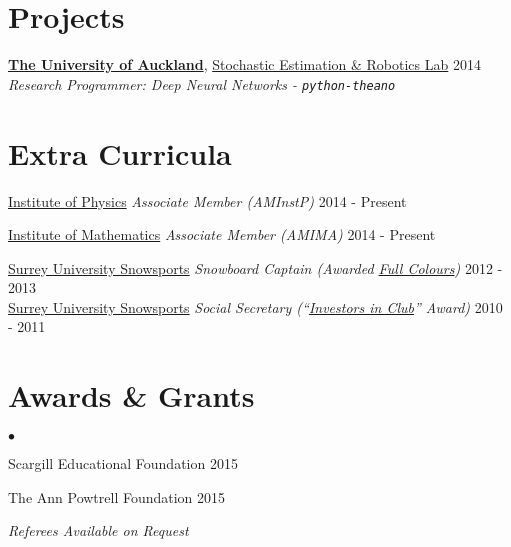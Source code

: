 \documentclass[margin, line]{res}
\newcommand{\IOP}{http://www.iop.org}
\newcommand{\IOM}{http://www.ima.org.uk}
\newcommand{\AucklandUni}{https://www.cs.auckland.ac.nz/en.html}
\newcommand{\AucklandResearch}{http://homepages.engineering.auckland.ac.nz/~smohan/Research.html}
\newcommand{\BFGS}{http://en.wikipedia.org/wiki/Broyden-Fletcher-Goldfarb-Shanno_algorithm}
\newcommand{\GARCH}{https://www.quantnet.com/threads/student-t-innovation-problems-garch-1-1.15612/\#post-125141}
\newcommand{\Jim}{http://www.jimal-khalili.com/teaching}
\newcommand{\susnow}{}%
\newcommand{\eussc}{}%
\newcommand{\Colours}{http://www.ussu.co.uk/ClubsSocieties/Sport/Colours\%20Documents/Colours\%20-\%20Individual\%20Club\%20Exceptions\%20to\%20Colours\%20Criteria\%202015.pdf}
\newcommand{\Investors}{}%
\newenvironment{list2}{
	\begin{list}{$\bullet$}{%
		\setlength{\itemsep}{0in}
		\setlength{\parsep}{0in} \setlength{\parskip}{0in}
		\setlength{\topsep}{0in} \setlength{\partopsep}{0in}
		\setlength{\leftmargin}{0.2in}}}{\end{list}}
\begin{document}
\begin{resume}
\vspace{0.15in}
\section{\sc Projects}

{\bf \href{\AucklandUni}{The University of Auckland}}, \href{\AucklandResearch}{Stochastic Estimation \& Robotics Lab} \hfill {2014}
\\
\vspace{-.3cm}
{\em Research Programmer: Deep Neural Networks - \verb|python-theano|}\\


\vspace{0.15in}
\section{\sc Extra Curricula}
{\href{\IOP}{Institute of Physics}}
\vspace*{-.0in}
{\em Associate Member (AMInstP)} \hfill { 2014 - Present} \\
\vspace*{-0.3in}

{\href{\IOM}{Institute of Mathematics}}
{\em Associate Member (AMIMA)} \hfill { 2014 - Present} \\
\vspace*{-0.3in}

{\href{\susnow}{Surrey University Snowsports}}
	{\em Snowboard Captain (Awarded \href{\Colours}{Full Colours})} \hfill {2012 - 2013}
\\
{\href{\susnow}{Surrey University Snowsports}}
	{\em Social Secretary (``\href{\Investors}{Investors in Club}'' Award)} \hfill {2010 - 2011} 


\vspace{0.15in}
\section{\sc Awards \& Grants}
\begin{list2}
	\item Scargill Educational Foundation \hfill {2015}
	\item The Ann Powtrell Foundation \hfill {2015}
\end{list2}
\vspace{0.2in}
\centerline{\emph{Referees Available on Request}}

\end{resume}
\end{document}
